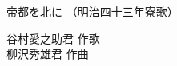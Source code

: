 \documentclass[10pt,b5j]{tarticle} %
\begin{document}
\begin{minipage}[c]{0.7\hsize} %
    \begin{center}
        {\LARGE
            帝都を北に %
        }
        {\small 
            （明治四十三年寮歌） %
        }
    \end{center}
\end{minipage}
\begin{minipage}[c]{0.3\hsize} %
    \begin{flushright} %
        谷村愛之助君 作歌\\柳沢秀雄君 作曲 %
    \end{flushright}
\end{minipage}
\end{document}
